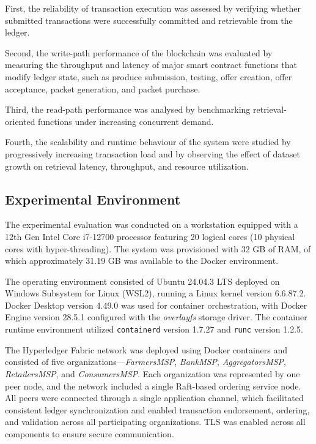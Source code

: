\documentclass[12pt]{article}
\begin{document}
	First, the reliability of transaction execution was assessed by verifying whether submitted transactions were successfully committed and retrievable from the ledger.
	
	Second, the write-path performance of the blockchain was evaluated by measuring the throughput and latency of major smart contract functions that modify ledger state, such as produce submission, testing, offer creation, offer acceptance, packet generation, and packet purchase.
	
	Third, the read-path performance was analysed by benchmarking retrieval-oriented functions under increasing concurrent demand.
	
	Fourth, the scalability and runtime behaviour of the system were studied by progressively increasing transaction load and by observing the effect of dataset growth on retrieval latency, throughput, and resource utilization.
	
	\subsection{Experimental Environment}
	
	
	The experimental evaluation was conducted on a workstation equipped with a 12th Gen Intel Core i7-12700 processor featuring 20 logical cores (10 physical cores with hyper-threading). The system was provisioned with 32 GB of RAM, of which approximately 31.19 GB was available to the Docker environment.
	
	The operating environment consisted of Ubuntu 24.04.3 LTS deployed on Windows Subsystem for Linux (WSL2), running a Linux kernel version 6.6.87.2. Docker Desktop version 4.49.0 was used for container orchestration, with Docker Engine version 28.5.1 configured with the \textit{overlayfs} storage driver. The container runtime environment utilized \texttt{containerd} version 1.7.27 and \texttt{runc} version 1.2.5.
	
	The Hyperledger Fabric network was deployed using Docker containers and consisted of five organizations—\textit{FarmersMSP}, \textit{BankMSP}, \textit{AggregatorsMSP}, \textit{RetailersMSP}, and \textit{ConsumersMSP}. Each organization was represented by one peer node, and the network included a single Raft-based ordering service node. All peers were connected through a single application channel, which facilitated consistent ledger synchronization and enabled transaction endorsement, ordering, and validation across all participating organizations. TLS was enabled across all components to ensure secure communication.
	
\end{document}
